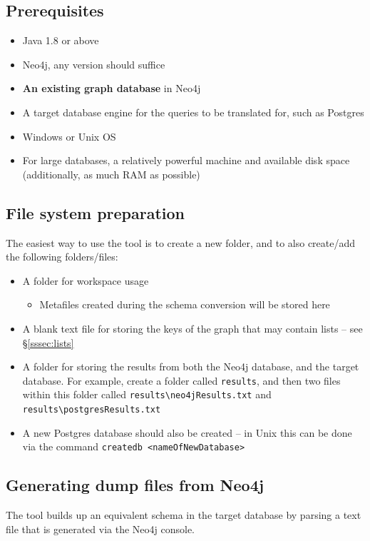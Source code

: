 \documentclass[letterpaper]{ltxdoc}
\begin{document}
\subsection{Prerequisites}
\begin{itemize}
\item Java 1.8 or above
\item Neo4j, any version should suffice
\item \textbf{An existing graph database} in Neo4j
\item A target database engine for the queries to be translated for, such as Postgres
\item Windows or Unix OS
\item For large databases, a relatively powerful machine and available disk space (additionally, as much RAM as possible)
\end{itemize}


\subsection{File system preparation}
The easiest way to use the tool is to create a new folder, and to also create/add the following folders/files:

\begin{itemize}
\item A folder for workspace usage
\begin{itemize}
\item Metafiles created during the schema conversion will be stored here
\end{itemize}
\item A blank text file for storing the keys of the graph that may contain lists -- see \S \ref{sssec:lists}
\item A folder for storing the results from both the Neo4j database, and the target database. For example, create a folder called \texttt{results}, and then two files within this folder called \texttt{results\textbackslash neo4jResults.txt} and \texttt{results\textbackslash postgresResults.txt}
\item A new Postgres database should also be created -- in Unix this can be done via the command \texttt{createdb <nameOfNewDatabase>}
\end{itemize}


\subsection{Generating dump files from Neo4j}
The tool builds up an equivalent schema in the target database by parsing a text file that is generated via the Neo4j console.
\end{document}
